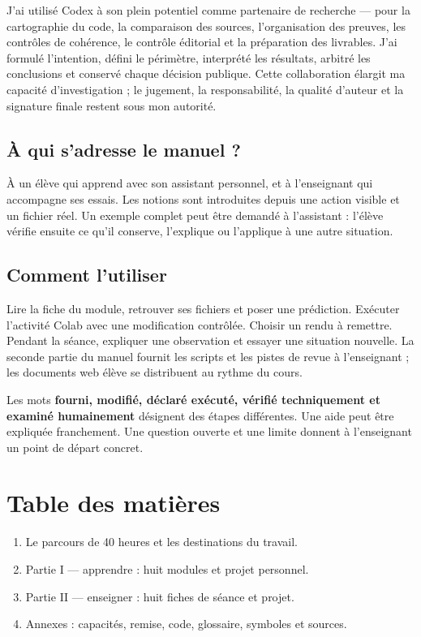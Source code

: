 \documentclass[
  canadien,
  11pt,
  a4paper,
]{report}
\providecommand{\tightlist}{%
  \setlength{\itemsep}{0pt}\setlength{\parskip}{0pt}}
\begin{document}
J'ai utilisé Codex à son plein potentiel comme partenaire de recherche
--- pour la cartographie du code, la comparaison des sources,
l'organisation des preuves, les contrôles de cohérence, le contrôle
éditorial et la préparation des livrables. J'ai formulé l'intention,
défini le périmètre, interprété les résultats, arbitré les conclusions
et conservé chaque décision publique. Cette collaboration élargit ma
capacité d'investigation ; le jugement, la responsabilité, la qualité
d'auteur et la signature finale restent sous mon autorité.

\subsection{À qui s'adresse le manuel
?}\label{uxe0-qui-sadresse-le-manuel}

À un élève qui apprend avec son assistant personnel, et à l'enseignant
qui accompagne ses essais. Les notions sont introduites depuis une
action visible et un fichier réel. Un exemple complet peut être demandé
à l'assistant : l'élève vérifie ensuite ce qu'il conserve, l'explique ou
l'applique à une autre situation.

\subsection{Comment l'utiliser}\label{comment-lutiliser}

Lire la fiche du module, retrouver ses fichiers et poser une prédiction.
Exécuter l'activité Colab avec une modification contrôlée. Choisir un
rendu à remettre. Pendant la séance, expliquer une observation et
essayer une situation nouvelle. La seconde partie du manuel fournit les
scripts et les pistes de revue à l'enseignant ; les documents web élève
se distribuent au rythme du cours.

Les mots \textbf{fourni, modifié, déclaré exécuté, vérifié techniquement
et examiné humainement} désignent des étapes différentes. Une aide peut
être expliquée franchement. Une question ouverte et une limite donnent à
l'enseignant un point de départ concret.

\section{Table des matières}\label{table-des-matiuxe8res}

\begin{enumerate}
\def\labelenumi{\arabic{enumi}.}
\tightlist
\item
  Le parcours de 40 heures et les destinations du travail.
\item
  Partie I --- apprendre : huit modules et projet personnel.
\item
  Partie II --- enseigner : huit fiches de séance et projet.
\item
  Annexes : capacités, remise, code, glossaire, symboles et sources.
\end{enumerate}
\end{document}
